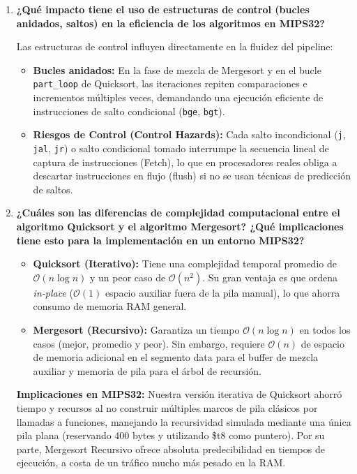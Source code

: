\documentclass[12pt,letterpaper]{article}
\begin{document}
\begin{enumerate}
    \item \textbf{\large\color{UCBlue}¿Qué impacto tiene el uso de estructuras de control (bucles anidados, saltos) en la eficiencia de los algoritmos en MIPS32?}
    
    \vspace{0.2cm}
    Las estructuras de control influyen directamente en la fluidez del pipeline:
    \begin{itemize}
        \item \textbf{Bucles anidados:} En la fase de mezcla de Mergesort y en el bucle \texttt{part\_loop} de Quicksort, las iteraciones repiten comparaciones e incrementos múltiples veces, demandando una ejecución eficiente de instrucciones de salto condicional (\texttt{bge}, \texttt{bgt}).
        \item \textbf{Riesgos de Control (Control Hazards):} Cada salto incondicional (\texttt{j}, \texttt{jal}, \texttt{jr}) o salto condicional tomado interrumpe la secuencia lineal de captura de instrucciones (Fetch), lo que en procesadores reales obliga a descartar instrucciones en flujo (flush) si no se usan técnicas de predicción de saltos.
    \end{itemize}

    \item \textbf{\large\color{UCBlue}¿Cuáles son las diferencias de complejidad computacional entre el algoritmo Quicksort y el algoritmo Mergesort? ¿Qué implicaciones tiene esto para la implementación en un entorno MIPS32?}
    
    \vspace{0.2cm}
    \begin{itemize}
        \item \textbf{Quicksort (Iterativo):} Tiene una complejidad temporal promedio de $\mathcal{O}(n \log n)$ y un peor caso de $\mathcal{O}(n^2)$. Su gran ventaja es que ordena \textit{in-place} ($\mathcal{O}(1)$ espacio auxiliar fuera de la pila manual), lo que ahorra consumo de memoria RAM general.
        \item \textbf{Mergesort (Recursivo):} Garantiza un tiempo $\mathcal{O}(n \log n)$ en todos los casos (mejor, promedio y peor). Sin embargo, requiere $\mathcal{O}(n)$ de espacio de memoria adicional en el segmento data para el buffer de mezcla auxiliar y memoria de pila para el árbol de recursión.
    \end{itemize}
    
    \textbf{\color{UCSky}\sffamily Implicaciones en MIPS32:} Nuestra versión iterativa de Quicksort ahorró tiempo y recursos al no construir múltiples marcos de pila clásicos por llamadas a funciones, manejando la recursividad simulada mediante una única pila plana (reservando 400 bytes y utilizando \$t8 como puntero). Por su parte, Mergesort Recursivo ofrece absoluta predecibilidad en tiempos de ejecución, a costa de un tráfico mucho más pesado en la RAM.


\end{enumerate}
\end{document}
